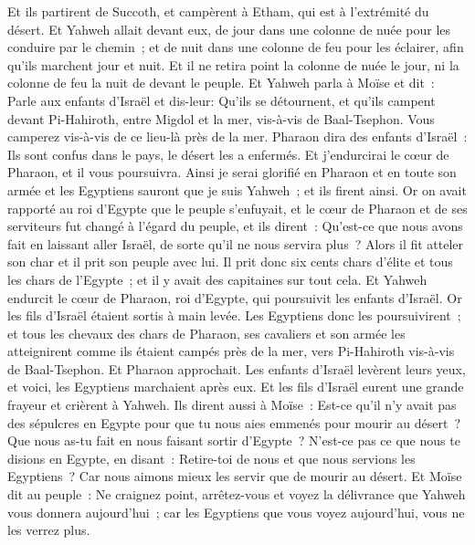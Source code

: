 \begin{multicols}{2}
Et ils partirent de Succoth, et campèrent à Etham, qui est à l'extrémité du désert.
Et Yahweh allait devant eux, de jour dans une colonne de nuée pour les conduire par le chemin~; et de nuit dans une colonne de feu pour les éclairer, afin qu'ils marchent jour et nuit.
Et il ne retira point la colonne de nuée le jour, ni la colonne de feu la nuit de devant le peuple.
\VerseOne{}Et Yahweh parla à Moïse et dit~:
Parle aux enfants d'Israël et dis-leur: Qu'ils se détournent, et qu'ils campent devant Pi-Hahiroth, entre Migdol et la mer, vis-à-vis de Baal-Tsephon. Vous camperez vis-à-vis de ce lieu-là près de la mer.
Pharaon dira des enfants d'Israël~: Ils sont confus dans le pays, le désert les a enfermés.
Et j'endurcirai le cœur de Pharaon, et il vous poursuivra. Ainsi je serai glorifié en Pharaon et en toute son armée et les Egyptiens sauront que je suis Yahweh~; et ils firent ainsi.
Or on avait rapporté au roi d'Egypte que le peuple s'enfuyait, et le cœur de Pharaon et de ses serviteurs fut changé à l'égard du peuple, et ils dirent~: Qu'est-ce que nous avons fait en laissant aller Israël, de sorte qu'il ne nous servira plus~?
Alors il fit atteler son char et il prit son peuple avec lui.
Il prit donc six cents chars d'élite et tous les chars de l'Egypte~; et il y avait des capitaines sur tout cela.
Et Yahweh endurcit le cœur de Pharaon, roi d'Egypte, qui poursuivit les enfants d'Israël. Or les fils d'Israël étaient sortis à main levée.
Les Egyptiens donc les poursuivirent~; et tous les chevaux des chars de Pharaon, ses cavaliers et son armée les atteignirent comme ils étaient campés près de la mer, vers Pi-Hahiroth vis-à-vis de Baal-Tsephon.
Et Pharaon approchait. Les enfants d'Israël levèrent leurs yeux, et voici, les Egyptiens marchaient après eux. Et les fils d'Israël eurent une grande frayeur et crièrent à Yahweh.
Ils dirent aussi à Moïse~: Est-ce qu'il n'y avait pas des sépulcres en Egypte pour que tu nous aies emmenés pour mourir au désert~? Que nous as-tu fait en nous faisant sortir d'Egypte~?
N'est-ce pas ce que nous te disions en Egypte, en disant~: Retire-toi de nous et que nous servions les Egyptiens~? Car nous aimons mieux les servir que de mourir au désert.
Et Moïse dit au peuple~: Ne craignez point, arrêtez-vous et voyez la délivrance que Yahweh vous donnera aujourd'hui~; car les Egyptiens que vous voyez aujourd'hui, vous ne les verrez plus.

\end{multicols}

